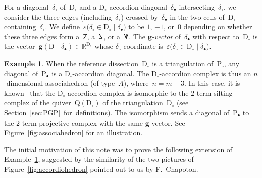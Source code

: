 \documentclass{amsart}
\theoremstyle{definition}
\newtheorem{example}[theorem]{Example}
\newcommand{\R}{\mathbb{R}} %
\renewcommand{\b}[1]{\mathbf{#1}} %
\newcommand{\bigset}[2]{\big\{ #1 \;\big|\; #2 \big\}} %
\newcommand{\eqdef}{\mbox{\,\raisebox{0.2ex}{\scriptsize\ensuremath{\mathrm:}}\ensuremath{=}\,}} %
\newcommand{\fref}[1]{Figure~\ref{#1}} %
\newcommand{\darkblue}{\color{darkblue}} %
\newcommand{\defn}[1]{\textsl{\darkblue #1}} %
\newcommand{\polygon}{\mathrm{P}} %
\newcommand{\dissection}{\mathrm{D}} %
\newcommand{\sign}[3]{\varepsilon \big( {#1} \in {#2}\;|\;{#3} \big)} %
\newcommand{\SSS}{\reflectbox{$\mathsf{Z}$}} %
\newcommand{\ZZZ}{\mathsf{Z}} %
\newcommand{\VVV}{{\mathsf{{V \hspace{-.1686cm} I\,}}}} %
\newcommand{\gvector}[2]{\mathbf{g}(#1 \,|\, #2)} %
\newcommand{\biggvectors}[2]{\mathbf{g} \big( #1 \,|\, #2 \big)} %
\newcommand{\quiver}{\mathrm{Q}} %
\begin{document}

For a diagonal~$\delta_\circ$ of~$\dissection_\circ$ and a $\dissection_\circ$-accordion diagonal~$\delta_\bullet$ intersecting~$\delta_\circ$, we consider the three edges (including~$\delta_\circ$) crossed by~$\delta_\bullet$ in the two cells of~$\dissection_\circ$ containing~$\delta_\circ$. We define~$\sign{\delta_\circ}{\dissection_\circ}{\delta_\bullet}$ to be $1$, $-1$, or~$0$ depending on whether these three edges form a~$\ZZZ$, a~$\SSS$, or a~$\VVV$.
The \defn{$\b{g}$-vector} of~$\delta_\bullet$ with respect to~$\dissection_\circ$ is the vector~$\gvector{\dissection_\circ}{\delta_\bullet} \in \R^{\dissection_\circ}$ whose $\delta_\circ$-coordinate is~$\sign{\delta_\circ}{\dissection_\circ}{\delta_\bullet}$.

\begin{example}
\label{exm:associahedron}
When the reference dissection~$\dissection_\circ$ is a triangulation of~$\polygon_\circ$, any diagonal of~$\polygon_\bullet$ is a $\dissection_\circ$-accordion diagonal.
The $\dissection_\circ$-accordion complex is thus an $n$-dimensional associahedron (of type~$A$), where~$n = m-3$.
In this case, it is known~\cite{??} that the $\dissection_\circ$-accordion complex is isomorphic to the $2$-term silting complex of the quiver~$\quiver(\dissection_\circ)$ of the triangulation~$\dissection_\circ$ (see Section~\ref{sec:PGP}~for~definitions).
The isomorphism sends a diagonal of~$\polygon_\bullet$ to the $2$-term projective complex with the same $\b{g}$-vector.
See \fref{fig:associahedron} for an illustration.
\end{example}

The initial motivation of this note was to prove the following extension of Example~\ref{exm:associahedron}, suggested by the similarity of the two pictures of \fref{fig:accordiohedron} pointed out to us by F.~Chapoton.
\end{document}
